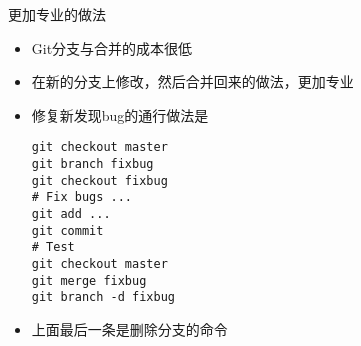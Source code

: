 \begin{frame}[<+->][fragile]{更加专业的做法}
    \begin{itemize}
        \item Git分支与合并的成本很低
        \item 在新的分支上修改，然后合并回来的做法，更加专业
        \item 修复新发现bug的通行做法是
        \begin{Verbatim}[frame=single,commandchars=\\\{\}]
git checkout master
git branch fixbug
git checkout fixbug
# Fix bugs ...
git add ...
git commit
# Test
git checkout master
git merge fixbug
git branch -d fixbug
        \end{Verbatim}
        \item 上面最后一条是删除分支的命令
    \end{itemize}
\end{frame}

